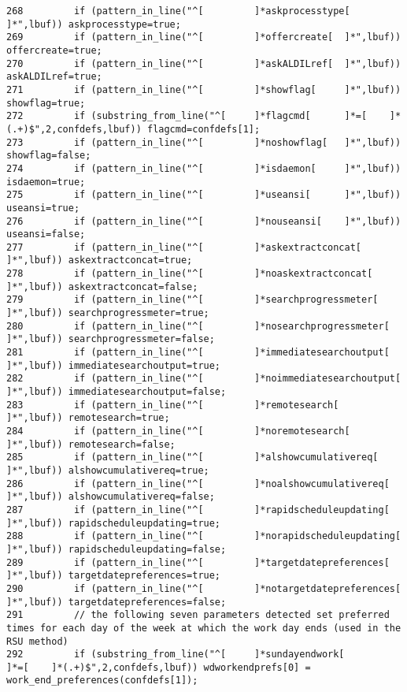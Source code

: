 \begin{verbatim}
268         if (pattern_in_line("^[         ]*askprocesstype[       ]*",lbuf)) askprocesstype=true;
269         if (pattern_in_line("^[         ]*offercreate[  ]*",lbuf)) offercreate=true;
270         if (pattern_in_line("^[         ]*askALDILref[  ]*",lbuf)) askALDILref=true;
271         if (pattern_in_line("^[         ]*showflag[     ]*",lbuf)) showflag=true;
272         if (substring_from_line("^[     ]*flagcmd[      ]*=[    ]*(.+)$",2,confdefs,lbuf)) flagcmd=confdefs[1];
273         if (pattern_in_line("^[         ]*noshowflag[   ]*",lbuf)) showflag=false;
274         if (pattern_in_line("^[         ]*isdaemon[     ]*",lbuf)) isdaemon=true;
275         if (pattern_in_line("^[         ]*useansi[      ]*",lbuf)) useansi=true;
276         if (pattern_in_line("^[         ]*nouseansi[    ]*",lbuf)) useansi=false;
277         if (pattern_in_line("^[         ]*askextractconcat[     ]*",lbuf)) askextractconcat=true;
278         if (pattern_in_line("^[         ]*noaskextractconcat[   ]*",lbuf)) askextractconcat=false;
279         if (pattern_in_line("^[         ]*searchprogressmeter[  ]*",lbuf)) searchprogressmeter=true;
280         if (pattern_in_line("^[         ]*nosearchprogressmeter[        ]*",lbuf)) searchprogressmeter=false;
281         if (pattern_in_line("^[         ]*immediatesearchoutput[        ]*",lbuf)) immediatesearchoutput=true;
282         if (pattern_in_line("^[         ]*noimmediatesearchoutput[      ]*",lbuf)) immediatesearchoutput=false;
283         if (pattern_in_line("^[         ]*remotesearch[         ]*",lbuf)) remotesearch=true;
284         if (pattern_in_line("^[         ]*noremotesearch[       ]*",lbuf)) remotesearch=false;
285         if (pattern_in_line("^[         ]*alshowcumulativereq[  ]*",lbuf)) alshowcumulativereq=true;
286         if (pattern_in_line("^[         ]*noalshowcumulativereq[        ]*",lbuf)) alshowcumulativereq=false;
287         if (pattern_in_line("^[         ]*rapidscheduleupdating[        ]*",lbuf)) rapidscheduleupdating=true;
288         if (pattern_in_line("^[         ]*norapidscheduleupdating[      ]*",lbuf)) rapidscheduleupdating=false;
289         if (pattern_in_line("^[         ]*targetdatepreferences[        ]*",lbuf)) targetdatepreferences=true;
290         if (pattern_in_line("^[         ]*notargetdatepreferences[      ]*",lbuf)) targetdatepreferences=false;
291         // the following seven parameters detected set preferred times for each day of the week at which the work day ends (used in the RSU method)
292         if (substring_from_line("^[     ]*sundayendwork[        ]*=[    ]*(.+)$",2,confdefs,lbuf)) wdworkendprefs[0] = work_end_preferences(confdefs[1]);

\end{verbatim}
